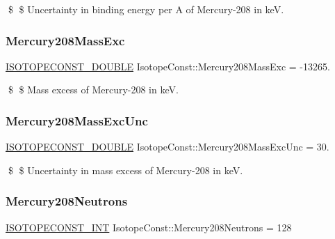 \$ \$ Uncertainty in binding energy per A of Mercury-\/208 in keV. \mbox{\label{group___isotope_const-_mercury-_hg208_ga51eae42342ce9078502049a9a709d53a}} 
\subsubsection{\texorpdfstring{Mercury208\+Mass\+Exc}{Mercury208MassExc}}
{\footnotesize\ttfamily \mbox{\hyperlink{group___isotope_const-_macros_ga8f45a7272ce02c0b4c65c44636ed719a}{I\+S\+O\+T\+O\+P\+E\+C\+O\+N\+S\+T\+\_\+\+D\+O\+U\+B\+LE}} Isotope\+Const\+::\+Mercury208\+Mass\+Exc = -\/13265.}

\$ \$ Mass excess of Mercury-\/208 in keV. \mbox{\label{group___isotope_const-_mercury-_hg208_ga78186221b74686cdb8c3caa7a327e9c5}} 
\subsubsection{\texorpdfstring{Mercury208\+Mass\+Exc\+Unc}{Mercury208MassExcUnc}}
{\footnotesize\ttfamily \mbox{\hyperlink{group___isotope_const-_macros_ga8f45a7272ce02c0b4c65c44636ed719a}{I\+S\+O\+T\+O\+P\+E\+C\+O\+N\+S\+T\+\_\+\+D\+O\+U\+B\+LE}} Isotope\+Const\+::\+Mercury208\+Mass\+Exc\+Unc = 30.}

\$ \$ Uncertainty in mass excess of Mercury-\/208 in keV. \mbox{\label{group___isotope_const-_mercury-_hg208_gad399e71c721915fcb995ebe1b272ce3b}} 
\subsubsection{\texorpdfstring{Mercury208\+Neutrons}{Mercury208Neutrons}}
{\footnotesize\ttfamily \mbox{\hyperlink{group___isotope_const-_macros_ga5f18360b3e99483a35c32d789e62621c}{I\+S\+O\+T\+O\+P\+E\+C\+O\+N\+S\+T\+\_\+\+I\+NT}} Isotope\+Const\+::\+Mercury208\+Neutrons = 128}


